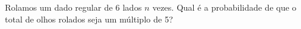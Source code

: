Rolamos um dado regular de 6 lados \(n\) vezes. Qual é a probabilidade de que o total de olhos rolados seja um múltiplo de 5?
